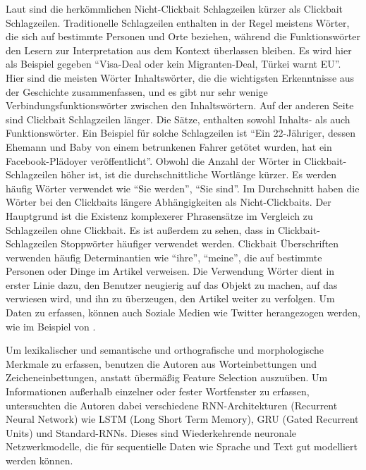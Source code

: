 

Laut \cite*{Chakrabortya} sind die herkömmlichen Nicht-Clickbait Schlagzeilen kürzer als Clickbait Schlagzeilen. Traditionelle Schlagzeilen enthalten in der Regel meistens Wörter, die sich auf bestimmte Personen und Orte beziehen, während die Funktionswörter den Lesern zur Interpretation aus dem Kontext überlassen bleiben. Es wird hier als Beispiel gegeben \enquote{Visa-Deal oder kein Migranten-Deal, Türkei warnt EU}. Hier sind die meisten Wörter Inhaltswörter, die die wichtigsten Erkenntnisse aus der Geschichte zusammenfassen, und es gibt nur sehr wenige Verbindungsfunktionswörter zwischen den Inhaltswörtern. Auf der anderen Seite sind Clickbait Schlagzeilen länger. Die Sätze, enthalten sowohl Inhalts- als auch Funktionswörter. Ein Beispiel für solche Schlagzeilen ist \enquote{Ein 22-Jähriger, dessen Ehemann und Baby von einem betrunkenen Fahrer getötet wurden, hat ein Facebook-Plädoyer veröffentlicht}. Obwohl die Anzahl der Wörter in Clickbait-Schlagzeilen höher ist, ist die durchschnittliche Wortlänge kürzer. Es werden häufig Wörter verwendet wie \enquote{Sie werden}, \enquote{Sie sind}. Im Durchschnitt haben die Wörter bei den Clickbaits längere Abhängigkeiten als Nicht-Clickbaits. Der Hauptgrund ist die Existenz komplexerer Phrasensätze im Vergleich zu Schlagzeilen ohne Clickbait. Es ist außerdem zu sehen, dass in Clickbait-Schlagzeilen Stoppwörter häufiger verwendet werden. Clickbait Überschriften verwenden häufig Determinantien wie \enquote{ihre}, \enquote{meine}, die auf bestimmte Personen oder Dinge im Artikel verweisen. Die Verwendung Wörter dient in erster Linie dazu, den Benutzer neugierig auf das Objekt zu machen, auf das verwiesen wird, und ihn zu überzeugen, den Artikel weiter zu verfolgen. Um Daten zu erfassen, können auch Soziale Medien wie Twitter herangezogen werden, wie im Beispiel von \cite*{Potthast}.


Um lexikalischer und semantische und orthografische und morphologische Merkmale zu erfassen, benutzen die Autoren aus \cite*{Anand2019} Worteinbettungen und Zeicheneinbettungen, anstatt übermäßig Feature Selection auszuüben. Um Informationen außerhalb einzelner oder fester Wortfenster zu erfassen, untersuchten die Autoren dabei verschiedene RNN-Architekturen (Recurrent Neural Network) wie LSTM (Long Short Term Memory), GRU (Gated Recurrent Units) und Standard-RNNs. Dieses sind Wiederkehrende neuronale Netzwerkmodelle, die für sequentielle Daten wie Sprache und Text gut modelliert werden können.


